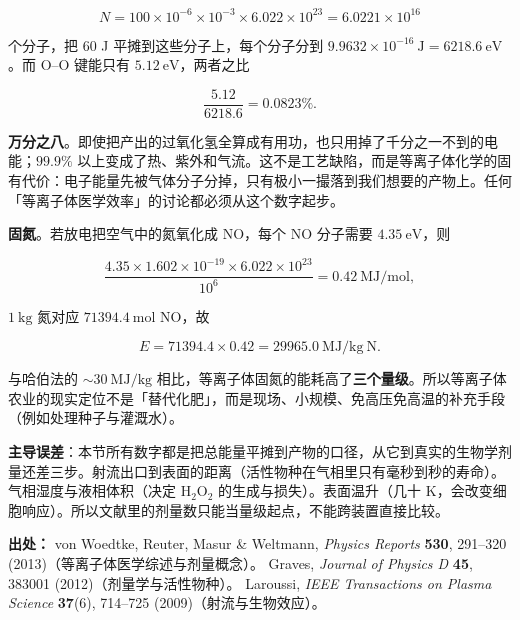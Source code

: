 \begin{equation}
  N = 100\times10^{-6}\times10^{-3}\times6.022\times10^{23} = 6.0221\times10^{16}
  \label{eq:app-p-h2o2num}
\end{equation}

个分子，把 60 J 平摊到这些分子上，每个分子分到 $9.9632\times10^{-16}\ \mathrm{J} = 6218.6\ \mathrm{eV}$。而 O--O 键能只有 $5.12\ \mathrm{eV}$，两者之比

\begin{equation}
  \frac{5.12}{6218.6} = 0.0823\%.
  \label{eq:app-p-medeff}
\end{equation}

\textbf{万分之八}。即使把产出的过氧化氢全算成有用功，也只用掉了千分之一不到的电能；$99.9\%$ 以上变成了热、紫外和气流。这不是工艺缺陷，而是等离子体化学的固有代价：电子能量先被气体分子分掉，只有极小一撮落到我们想要的产物上。任何「等离子体医学效率」的讨论都必须从这个数字起步。

\textbf{固氮}。若放电把空气中的氮氧化成 NO，每个 NO 分子需要 $4.35\ \mathrm{eV}$，则

\begin{equation}
  \frac{4.35\times1.602\times10^{-19}\times6.022\times10^{23}}{10^{6}} = 0.42\ \mathrm{MJ/mol},
  \label{eq:app-p-no}
\end{equation}

$1\ \mathrm{kg}$ 氮对应 $71394.4\ \mathrm{mol}$ NO，故

\begin{equation}
  E = 71394.4\times0.42 = 29965.0\ \mathrm{MJ/kg\ N}.
  \label{eq:app-p-nfix}
\end{equation}

与哈伯法的 $\sim30\ \mathrm{MJ/kg}$ 相比，等离子体固氮的能耗高了\textbf{三个量级}。所以等离子体农业的现实定位不是「替代化肥」，而是现场、小规模、免高压免高温的补充手段（例如处理种子与灌溉水）。

\textbf{主导误差}：本节所有数字都是把总能量平摊到产物的口径，从它到真实的生物学剂量还差三步。射流出口到表面的距离（活性物种在气相里只有毫秒到秒的寿命）。气相湿度与液相体积（决定 $\mathrm{H_2O_2}$ 的生成与损失）。表面温升（几十 $\mathrm{K}$，会改变细胞响应）。所以文献里的剂量数只能当量级起点，不能跨装置直接比较。

{\footnotesize
\textbf{出处：} von Woedtke, Reuter, Masur \& Weltmann, \emph{Physics Reports} \textbf{530}, 291--320 (2013)（等离子体医学综述与剂量概念）。
Graves, \emph{Journal of Physics D} \textbf{45}, 383001 (2012)（剂量学与活性物种）。
Laroussi, \emph{IEEE Transactions on Plasma Science} \textbf{37}(6), 714--725 (2009)（射流与生物效应）。
}

